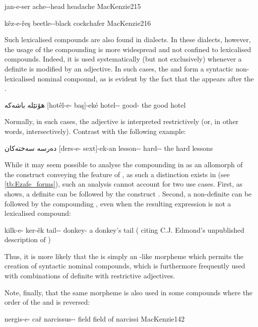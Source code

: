{jan-e-ser}
{ache-\ez-head}
{headache}
{MacKenzie}{215}

{kêz-e-řeş}
{beetle-\ez-black}
{cockchafer}
{MacKenzie}{216}

Such lexicalised compounds are also found in \Sor dialects. In these dialects, however, the usage of the compounding \ez* is more widespread and not confined to lexicalised compounds. Indeed, it is used systematically (but not exclusively) whenever a definite \prim is modified by an adjective. In such cases, the \prim and \secn form a syntactic non-lexicalised nominal compound, as is evident by the fact that the  appears after the \secn.

{هۆتێلە باشەكە}
{[hotêl-e- baş]-eké}
{hotel-\ez- good-}
{the good hotel}
{\citep[11]{ThackstonSorani}}

 
Normally, in such cases, the adjective is interpreted restrictively (or, in other words, intersectively). 
Contrast    with the following example:

{دەرسە سەختەكان}
{[ders-e- sext]-ek-an}
{lesson-\ez- hard--\pl}
{the hard lessons}
{\citep[12]{ThackstonSorani}}

While it may seem possible to analyse the compounding \ez* in \Sor as an allomorph of the construct \ez* conveying the feature of , as such a distinction exists in \Kur (see \vref{tb:Ezafe_forms}), such an analysis cannot account for two use cases. First, as  shows, a definite \prim can be followed by the construct \ez*. Second, a non-definite \prim can be followed by the compounding \ez*, even when the resulting expression is not a lexicalised compound:

{kilk-e- ker-êk}
{tail-\ez- donkey-\indef}
{a donkey's tail}
{}{(\cite[65]{MacKenzie} citing C.J. Edmond's unpublished description of \KSul)}

Thus, it is more likely that the \Sor {} is simply an \ez*-like morpheme which permits the creation of syntactic nominal compounds, which is furthermore frequently used with combinations of definite \prims with restrictive adjectives.

Note, finally, that the same morpheme is also used in some compounds where the order of the \prim and \secn is reversed:

{nergis-e- cař}
{narcissus-\ez- field}
{field of narcissi}
{MacKenzie}{142}

